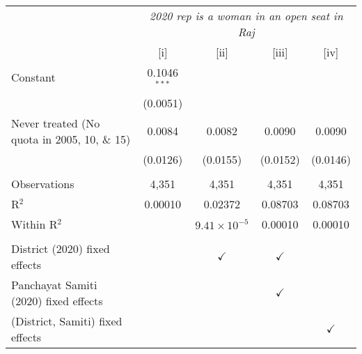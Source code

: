 
\begingroup
\centering
\begin{tabular}{lcccc}
   \toprule
    & \multicolumn{4}{c}{\textit{2020 rep is a woman in an open seat in Raj}}\\
                                                & [i]            & [ii]                  & [iii]         & [iv]\\  
   \midrule 
   Constant                                     & 0.1046$^{***}$ &                       &               &   \\   
                                                & (0.0051)       &                       &               &   \\   
   Never treated (No quota in 2005, 10, \& 15)  & 0.0084         & 0.0082                & 0.0090        & 0.0090\\   
                                                & (0.0126)       & (0.0155)              & (0.0152)      & (0.0146)\\   
    \\
   Observations                                 & 4,351          & 4,351                 & 4,351         & 4,351\\  
   R$^2$                                        & 0.00010        & 0.02372               & 0.08703       & 0.08703\\  
   Within R$^2$                                 &                & $9.41\times 10^{-5}$  & 0.00010       & 0.00010\\  
    \\
   District (2020) fixed effects                &                & $\checkmark$          & $\checkmark$  & \\  
   Panchayat Samiti (2020) fixed effects        &                &                       & $\checkmark$  & \\  
   (District, Samiti) fixed effects             &                &                       &               & $\checkmark$\\   
   \bottomrule
\end{tabular}
\par\endgroup



